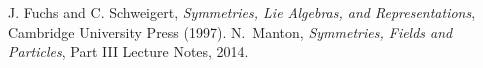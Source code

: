 \documentclass{report}
\begin{document}
\maketitle
\hypersetup{linkcolor=black}  %
\tableofcontents
\hypersetup{linkcolor=MidnightBlue!50!BlueViolet}


























\begin{thebibliography}{99}

   J. Fuchs and C. Schweigert, \emph{Symmetries, Lie Algebras, and Representations}, Cambridge University Press (1997).
   N.~Manton, \emph{Symmetries, Fields and Particles}, Part III Lecture Notes, 2014.

\end{thebibliography}
\end{document}
